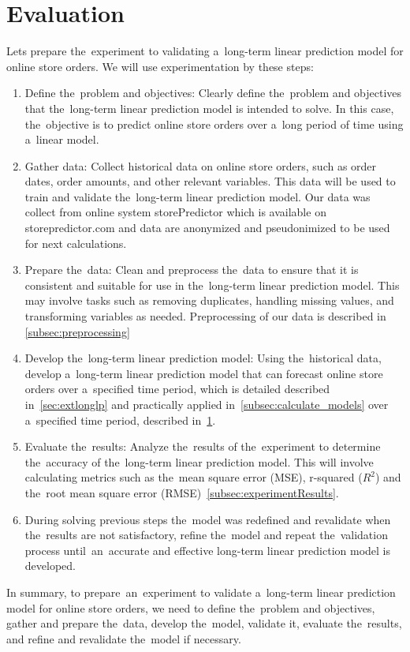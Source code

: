 
\chapter{Evaluation} \label{evaluation}
Lets prepare the~experiment to validating a~long-term linear prediction model for online store orders.
We will use experimentation by these steps:\\
\begin{enumerate}
    \item Define the~problem and objectives: Clearly define the~problem and objectives that the~long-term linear
    prediction model is intended to solve. In this case, the~objective is to predict online store orders over a~long
    period of time using a~linear model.
    \item Gather data: Collect historical data on online store orders, such as order dates, order amounts, and other
    relevant variables. This data will be used to train and validate the~long-term linear prediction model.
    Our data was collect from online system storePredictor which is available on storepredictor.com and data are
    anonymized and pseudonimized to be used for next calculations.
    \item Prepare the~data: Clean and preprocess the~data to ensure that it is consistent and suitable for
    use in the~long-term linear prediction model. This may involve tasks such as removing duplicates, handling missing
    values, and transforming variables as needed. Preprocessing of our data is described in \ref{subsec:preprocessing}
    \item Develop the~long-term linear prediction model: Using the~historical data, develop a~long-term linear
    prediction model that can forecast online store orders over a~specified time period, which is detailed
    described in~\ref{sec:extlonglp} and practically applied in~\ref{subsec:calculate_models}
    over a~specified time period, described in~\ref{evaluation}.
    \item Evaluate the~results: Analyze the~results of the~experiment to determine the~accuracy of the~long-term
    linear prediction model. This will involve calculating metrics such as the~mean square error (MSE),
    r-squared ($R^2$) and the~root mean square error (RMSE)~\ref{subsec:experimentResults}.
    \item During solving previous steps the~model was redefined and revalidate when the~results are not satisfactory,
    refine the~model and repeat the~validation process until~an~accurate and effective long-term linear prediction
    model is developed.
\end{enumerate}
In summary, to prepare~an~experiment to validate a~long-term linear prediction model for online store orders, we need to
define the~problem and objectives, gather and prepare the~data, develop the~model, validate it, evaluate the~results,
and refine and revalidate the~model if necessary.

